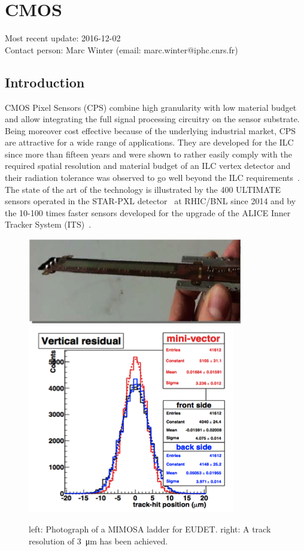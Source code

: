 \section{CMOS}
Most recent update: 2016-12-02 \\
Contact person: Marc Winter (email: marc.winter@iphc.cnrs.fr)
\subsection{Introduction}
CMOS Pixel Sensors (CPS) combine high granularity with low material
budget and allow integrating the full signal processing circuitry on
the sensor substrate. Being moreover cost effective because of the
underlying industrial market, CPS are attractive for a wide range of
applications. They are developed for the ILC since more than fifteen
years and were shown to rather easily comply with the required spatial
resolution and material budget of an ILC vertex detector and their
radiation tolerance was observed to go well beyond the ILC requirements~\cite{Behnke:2013lya}. The state of the art of the technology is illustrated
by the 400 ULTIMATE sensors operated in the STAR-PXL detector~\cite{Greiner201168}
at RHIC/BNL since 2014 and by the 10-100 times faster
sensors developed for the upgrade of the ALICE Inner Tracker System
(ITS)~\cite{0954-3899-41-8-087002}.

\begin{figure}[hb]
	\centering
	\includegraphics[width=.5\linewidth]{VertexDetector/CMOS/Ladder}
	\includegraphics[width=.34\linewidth]{VertexDetector/CMOS/trackResolution.png}
	\caption{left: Photograph of a MIMOSA ladder for EUDET. right: A track resolution of \SI{3}{\micro\meter} has been achieved.}
	\label{fig:VertexDetector:CMOS}
\end{figure}

